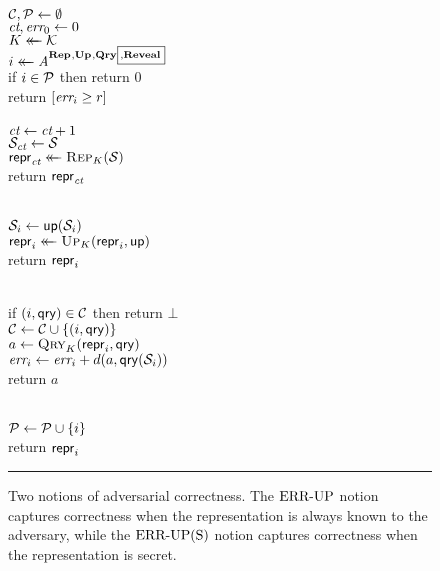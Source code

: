 \newcommand{\REVO}{\mathbf{Reveal}}

\begin{figure}[t]
  {
     \\[2pt]
      $\mathcal{C},\mathcal{P} \gets \emptyset$\\
      $\textit{ct},\textit{err}_0 \gets 0$ \\
      $K \mathrel{\leftarrow\mkern-14mu\leftarrow} \mathcal{K}$\\
      $i \getsr \advA^{\REPO,\UPO,\QRYO{\scriptsize\boxed{\!,\!\REVO}}}$\\
      if $i \in \mathcal{P}$ then return 0 \\
      return $[\textit{err}_i \geq r]$ 
    \\[6pt]
    \oraclev{$\REPO(\col)$}\\[2pt]
      $\textit{ct}\gets\textit{ct}+1$ \\
      $\mathcal{S}_{\textit{ct}} \gets \mathcal{S}$\\
      $\mathsf{repr}_{\textit{ct}} \mathrel{\leftarrow\mkern-14mu\leftarrow} \textsc{Rep}_K(\mathcal{S})$\\
      return $\mathsf{repr}_{\textit{ct}}$   }
  {
    \\[2pt]
      $\mathcal{S}_i \gets \mathsf{up}(\mathcal{S}_i)$\\
      $\mathsf{repr}_i \mathrel{\leftarrow\mkern-14mu\leftarrow} \textsc{Up}_K(\mathsf{repr}_i, \mathsf{up})$\\
      return $\mathsf{repr}_i$ 
      \medskip

    \\[2pt]
      if $(i,\mathsf{qry}) \in \mathcal{C}$ then return $\bot$\\
      $\mathcal{C} \gets \mathcal{C} \cup \{(i,\mathsf{qry})\}$\\
      $a \gets \textsc{Qry}_K(\mathsf{repr}_i, \mathsf{qry})$\\
      $\textit{err}_i \gets \textit{err}_i + d(a,\mathsf{qry}(\mathcal{S}_i))$\\
      return $a$
      \medskip

    \oraclev{$\REVO(i, \qry)$}\\[2pt]
     $\mathcal{P} \gets \mathcal{P} \cup \{i\}$ \\
      return $\mathsf{repr}_i$
  }
  \caption{Two notions of adversarial correctness. The $\textnormal{ERR\mbox{-}UP}$ notion captures correctness when the representation is always known to the adversary, while the $\textnormal{ERR\mbox{-}UP(S)}$ notion captures correctness when the representation is secret.}
  \vspace{6pt}\hrule
  \label{fig:security}
\end{figure}

